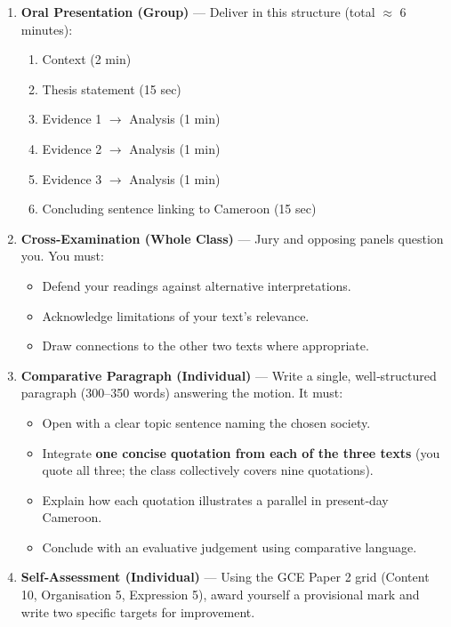\documentclass[11pt]{article}
\begin{document}
\begin{methode}
\begin{enumerate}
\begin{itemize}
      \end{itemize}
\item \textbf{Oral Presentation (Group)} — Deliver in this structure (total $\approx$ 6 minutes):
      \begin{enumerate}
          \item Context (2 min)
          \item Thesis statement (15 sec)
          \item Evidence 1 $\rightarrow$ Analysis (1 min)
          \item Evidence 2 $\rightarrow$ Analysis (1 min)
          \item Evidence 3 $\rightarrow$ Analysis (1 min)
          \item Concluding sentence linking to Cameroon (15 sec)
      \end{enumerate}
\item \textbf{Cross‑Examination (Whole Class)} — Jury and opposing panels question you. You must:
      \begin{itemize}
          \item Defend your readings against alternative interpretations.
          \item Acknowledge limitations of your text’s relevance.
          \item Draw connections to the other two texts where appropriate.
      \end{itemize}
\item \textbf{Comparative Paragraph (Individual)} — Write a single, well‑structured paragraph (300–350 words) answering the motion. It must:
      \begin{itemize}
          \item Open with a clear topic sentence naming the chosen society.
          \item Integrate \textbf{one concise quotation from each of the three texts} (you quote all three; the class collectively covers nine quotations).
          \item Explain how each quotation illustrates a parallel in present‑day Cameroon.
          \item Conclude with an evaluative judgement using comparative language.
      \end{itemize}
\item \textbf{Self‑Assessment (Individual)} — Using the GCE Paper 2 grid (Content 10, Organisation 5, Expression 5), award yourself a provisional mark and write two specific targets for improvement.
\end{enumerate}
\end{methode}
\end{document}
